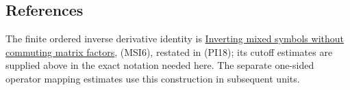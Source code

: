 \documentclass[
  11pt,
]{article}
\makeatletter
\let\ReaderOriginalAnchorStart\hyper@anchorstart
\let\ReaderOriginalAnchorEnd\hyper@anchorend
\let\ReaderPendingAliases\@empty
\def\ReaderArmAliases#1{\gdef\ReaderPendingAliases{#1}}
\def\hyper@anchorstart#1{\ReaderIfNativeAnchorTF{#1}{\ReaderPendingAliases\global\let\ReaderPendingAliases\@empty}{}\ReaderOriginalAnchorStart{#1}}
\makeatother
\begin{document}
\ReaderArmAliases{\ReaderOriginalAnchorStart{prerequisites-and-mathematical-antecedent}\ReaderOriginalAnchorEnd\begingroup\expandafter\def\csname @currentHref\endcsname{prerequisites-and-mathematical-antecedent}\label{prerequisites-and-mathematical-antecedent}\endgroup\ReaderOriginalAnchorStart{references}\ReaderOriginalAnchorEnd}
\subsection{References}\label{references}

The finite ordered inverse derivative identity is
\href{mixed-symbol-inversion.pdf}{Inverting mixed symbols without
commuting matrix factors}, (MSI6), restated in (PI18); its cutoff
estimates are supplied above in the exact notation needed here. The
separate one-sided operator mapping estimates use this construction in
subsequent units.
\end{document}
